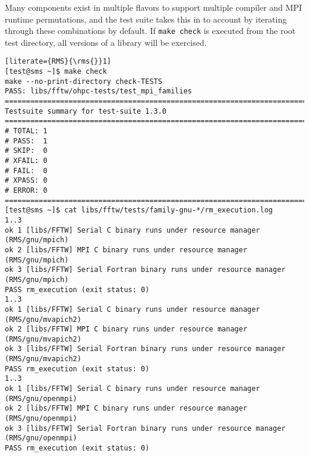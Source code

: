 Many \OHPC components exist in multiple flavors to support multiple compiler
and MPI runtime permutations, and the test suite takes this in to account by
iterating through these combinations by default. If \texttt{make check} is executed
from the root test directory, all versions of a library will be exercised.

\begin{lstlisting}[literate={RMS}{\rms{}}1]
[test@sms ~]$ make check
make --no-print-directory check-TESTS
PASS: libs/fftw/ohpc-tests/test_mpi_families
============================================================================
Testsuite summary for test-suite 1.3.0
============================================================================
# TOTAL: 1
# PASS:  1
# SKIP:  0
# XFAIL: 0
# FAIL:  0
# XPASS: 0
# ERROR: 0
============================================================================
[test@sms ~]$ cat libs/fftw/tests/family-gnu-*/rm_execution.log 
1..3
ok 1 [libs/FFTW] Serial C binary runs under resource manager (RMS/gnu/mpich)
ok 2 [libs/FFTW] MPI C binary runs under resource manager (RMS/gnu/mpich)
ok 3 [libs/FFTW] Serial Fortran binary runs under resource manager (RMS/gnu/mpich)
PASS rm_execution (exit status: 0)
1..3
ok 1 [libs/FFTW] Serial C binary runs under resource manager (RMS/gnu/mvapich2)
ok 2 [libs/FFTW] MPI C binary runs under resource manager (RMS/gnu/mvapich2)
ok 3 [libs/FFTW] Serial Fortran binary runs under resource manager (RMS/gnu/mvapich2)
PASS rm_execution (exit status: 0)
1..3
ok 1 [libs/FFTW] Serial C binary runs under resource manager (RMS/gnu/openmpi)
ok 2 [libs/FFTW] MPI C binary runs under resource manager (RMS/gnu/openmpi)
ok 3 [libs/FFTW] Serial Fortran binary runs under resource manager (RMS/gnu/openmpi)
PASS rm_execution (exit status: 0)
\end{lstlisting}
